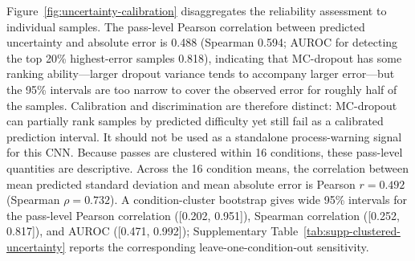 Figure~\ref{fig:uncertainty-calibration} disaggregates the reliability
assessment to individual samples. The pass-level Pearson correlation between
predicted uncertainty and absolute error is 0.488 (Spearman 0.594; AUROC for
detecting the top 20\% highest-error samples 0.818), indicating that
MC-dropout has some ranking ability---larger dropout variance tends to
accompany larger error---but the 95\% intervals are too narrow to cover
the observed error for roughly half of the samples. Calibration and
discrimination are therefore distinct: MC-dropout can partially rank
samples by predicted difficulty yet still fail as a calibrated
prediction interval. It should not be used as a standalone process-warning
signal for this CNN. Because passes are clustered within 16 conditions,
these pass-level quantities are descriptive. Across the 16 condition means,
the correlation between mean predicted standard deviation and mean absolute
error is Pearson $r=0.492$ (Spearman $\rho=0.732$). A condition-cluster
bootstrap gives wide 95\% intervals for the pass-level Pearson correlation
([0.202, 0.951]), Spearman correlation ([0.252, 0.817]), and AUROC
([0.471, 0.992]); Supplementary Table~\ref{tab:supp-clustered-uncertainty}
reports the corresponding leave-one-condition-out sensitivity.

